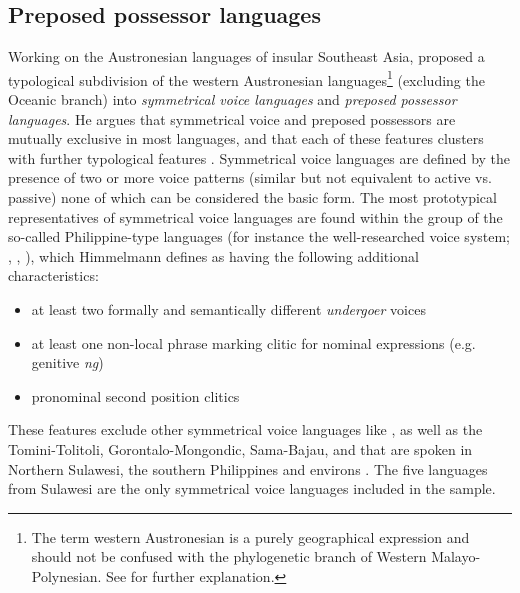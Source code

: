 \subsection{Preposed possessor languages}\label{sec:preposed}

Working on the Austronesian languages of insular Southeast Asia, \citet{Himmelmann2005austronesian} proposed a typological subdivision of the western Austronesian languages\footnote{The term western Austronesian is a purely geographical expression and should not be confused with the phylogenetic branch of Western Malayo-Polynesian. See \citet{Himmelmann2005austronesian} for further explanation.} (excluding the Oceanic branch) into \emph{symmetrical voice languages} and \emph{preposed possessor languages}. He argues that symmetrical voice and preposed possessors are mutually exclusive in most languages, and that each of these features clusters with further typological features \citep[113]{Himmelmann2005austronesian}. Symmetrical voice languages are defined by the presence of two or more voice patterns (similar but not equivalent to active vs. passive) none of which can be considered the basic form. The most prototypical representatives of symmetrical voice languages are found within the group of the so-called Philippine-type languages (for instance the well-researched  voice system; \citealt{schachter1976subject}, \citealt{Himmelmann2005tagalog}, \citealt{riesberg2014symmetrical}), which Himmelmann defines as having the following additional characteristics:

\begin{itemize}
\item at least two formally and semantically different \textit{undergoer} voices
\item at least one non-local phrase marking clitic for nominal expressions (e.g.  genitive \textit{ng})
\item pronominal second position clitics
\end{itemize}

These features exclude other symmetrical voice languages like ,  as well as the Tomini-Tolitoli, Gorontalo-Mongondic, Sama-Bajau, and  that are spoken in Northern Sulawesi, the southern Philippines and environs \citep[113]{Himmelmann2005austronesian}. The five languages from Sulawesi are the only symmetrical voice languages included in the sample.

